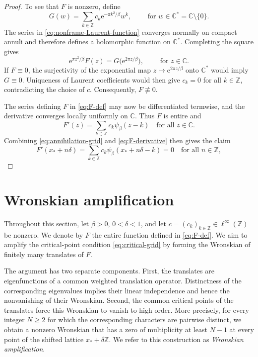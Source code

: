 \documentclass[11pt]{amsart}
\numberwithin{equation}{section}
\theoremstyle{definition}
\theoremstyle{remark}
\newcommand{\C}{\mathbb C}
\newcommand{\Z}{\mathbb Z}
\newcommand{\e}{\mathrm e}
\begin{document}
\begin{proof}
        To see that $F$ is nonzero, define
        \begin{equation}\label{eq:nonframe-Laurent-function}
            G(w)=\sum_{k\in\Z}c_k\e^{-\pi k^2/\beta}w^k,
            \qquad \text{ for } w\in\C^* = \C \setminus \{0\}.
        \end{equation}
        The series in \eqref{eq:nonframe-Laurent-function} converges normally on compact annuli and therefore defines a holomorphic function on $\C^*$. Completing the square gives
        \begin{equation}\label{eq:nonframe-Laurent-identity}
            \e^{\pi z^2/\beta}F(z)=G\bigl(\e^{2\pi z/\beta}\bigr),
            \qquad \text{ for }  z\in\C.
        \end{equation}
        If $F\equiv0$, the surjectivity of the exponential map $z\mapsto\e^{2\pi z/\beta}$ onto $\C^*$ would imply $G\equiv0$. Uniqueness of Laurent coefficients would then give $c_k=0$ for all $k\in\Z$, contradicting the choice of $c$. Consequently, $F\not\equiv0$.

        The series defining $F$ in \eqref{eq:F-def} may now be differentiated termwise, and the derivative converges locally uniformly on $\C$. Thus $F$ is entire and
        \begin{equation}\label{eq:F-derivative}
            F'(z)=\sum_{k\in\Z}c_k \psi_\beta(z-k)
            \quad\text{for all }z\in\C.
        \end{equation}
        Combining \eqref{eq:annihilation-grid} and \eqref{eq:F-derivative} then gives the claim
        \begin{equation} 
            F'(x_*+n\delta)
            =\sum_{k\in\Z}c_k \psi_\beta(x_*+n\delta-k)
            = 0 
            \quad\text{for all }n\in\Z,
        \end{equation}
    \end{proof}

\section{Wronskian amplification}\label{sec:Wronskian}
Throughout this section, let $\beta>0$, $0<\delta<1$, and let $c=(c_k)_{k\in\Z}\in\ell^\infty(\Z)$ be nonzero. We denote by $F$ the entire function defined in \eqref{eq:F-def}. We aim to amplify the critical-point condition \eqref{eq:critical-grid} by forming the Wronskian of finitely many translates of $F$.

The argument has two separate components. First, the translates are eigenfunctions of a common weighted translation operator. Distinctness of the corresponding eigenvalues implies their linear independence and hence the nonvanishing of their Wronskian. Second, the common critical points of the translates force this Wronskian to vanish to high order. More precisely, for every integer $N\geq2$ for which the corresponding characters are pairwise distinct, we obtain a nonzero Wronskian that has a zero of multiplicity at least $N-1$ at every point of the shifted lattice $x_*+\delta\Z$. We refer to this construction as \emph{Wronskian amplification}.
\end{document}
